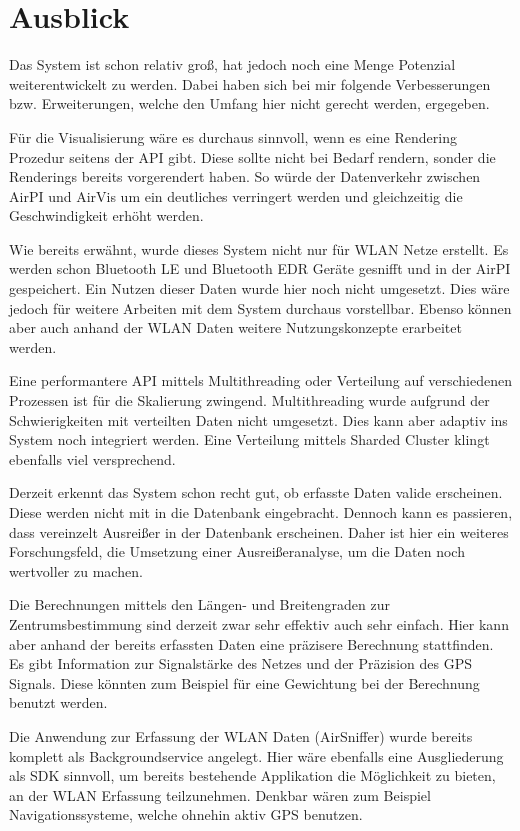 \documentclass[11pt,a4paper]{article}
\begin{document}
\section{Ausblick}

Das System ist schon relativ groß, hat jedoch noch eine Menge Potenzial weiterentwickelt zu werden. Dabei haben sich bei mir folgende Verbesserungen bzw. Erweiterungen, welche den Umfang hier nicht gerecht werden, ergegeben.

Für die Visualisierung wäre es durchaus sinnvoll, wenn es eine Rendering Prozedur seitens der API gibt. Diese sollte nicht bei Bedarf rendern, sonder die Renderings bereits vorgerendert haben. So würde der Datenverkehr zwischen AirPI und AirVis um ein deutliches verringert werden und gleichzeitig die Geschwindigkeit erhöht werden.

Wie bereits erwähnt, wurde dieses System nicht nur für WLAN Netze erstellt. Es werden schon Bluetooth LE und Bluetooth EDR Geräte gesnifft und in der AirPI gespeichert. Ein Nutzen dieser Daten wurde hier noch nicht umgesetzt. Dies wäre jedoch für weitere Arbeiten mit dem System durchaus vorstellbar. Ebenso können aber auch anhand der WLAN Daten weitere Nutzungskonzepte erarbeitet werden.

Eine performantere API mittels Multithreading oder Verteilung auf verschiedenen Prozessen ist für die Skalierung zwingend. Multithreading wurde aufgrund der Schwierigkeiten mit verteilten Daten nicht umgesetzt. Dies kann aber adaptiv ins System noch integriert werden. Eine Verteilung mittels Sharded Cluster klingt ebenfalls viel versprechend.

Derzeit erkennt das System schon recht gut, ob erfasste Daten valide erscheinen. Diese werden nicht mit in die Datenbank eingebracht. Dennoch kann es passieren, dass vereinzelt Ausreißer in der Datenbank erscheinen. Daher ist hier ein weiteres Forschungsfeld, die Umsetzung einer Ausreißeranalyse, um die Daten noch wertvoller zu machen.

Die Berechnungen mittels den Längen- und Breitengraden zur Zentrumsbestimmung sind derzeit zwar sehr effektiv auch sehr einfach. Hier kann aber anhand der bereits erfassten Daten eine präzisere Berechnung stattfinden. Es gibt Information zur Signalstärke des Netzes und der Präzision des GPS Signals. Diese könnten zum Beispiel für eine Gewichtung bei der Berechnung benutzt werden.

Die Anwendung zur Erfassung der WLAN Daten (AirSniffer) wurde bereits komplett als Backgroundservice angelegt. Hier wäre ebenfalls eine Ausgliederung als SDK sinnvoll, um bereits bestehende Applikation die Möglichkeit zu bieten, an der WLAN Erfassung teilzunehmen. Denkbar wären zum Beispiel Navigationssysteme, welche ohnehin aktiv GPS benutzen. 
\end{document}
